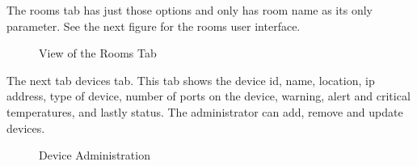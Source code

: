 \documentclass{report}
\begin{document}
The rooms tab has just those options and only has room name as its only parameter. See the next figure for the rooms user interface.
\begin{figure}[H]
	\caption{View of the Rooms Tab}
\end{figure}
\newpage

The next tab devices tab. This tab shows the device id, name, location, ip address, type of device, number of ports on the device, warning, alert and critical temperatures, and lastly status. The administrator can add, remove and update devices. 
\begin{figure}[H]
	\caption{Device Administration}
\end{figure}
\newpage
\end{document}
